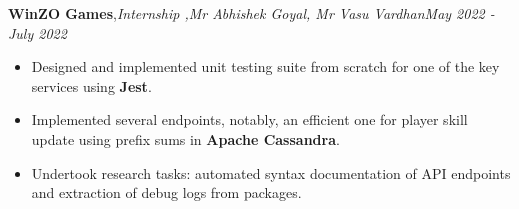 \textbf{WinZO Games}\sep{\it Internship \sep Mr Abhishek Goyal, Mr Vasu Vardhan}\hfill {\sl \small May 2022 - July 2022}\\
\vspace{-5pt}
\begin{itemize}[itemsep = -1.3 mm, leftmargin=*]
\item Designed and implemented unit testing suite from scratch for one of the key services using {\bf Jest}.
\item Implemented several endpoints, notably, an efficient one for player skill update using prefix sums in {\bf Apache Cassandra}.
\item Undertook research tasks: automated syntax documentation of API endpoints and extraction of debug logs from packages.
\end{itemize}